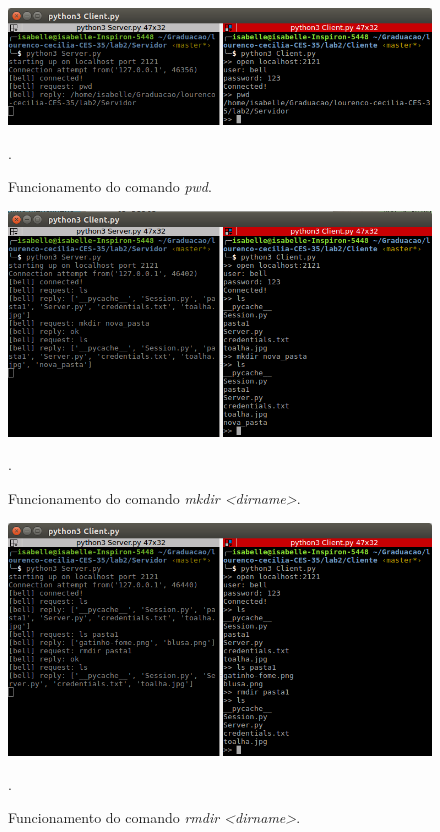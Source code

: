 \documentclass[conference]{IEEEtran}
\begin{document}
\begin{figure}[H]
\centering
\centerline{\includegraphics[scale=0.3]{prints/pwd.png}}
\caption{Funcionamento do comando \textit{pwd}.}.
\label{pwd1}
\end{figure}

\begin{figure}[H]
\centering
\centerline{\includegraphics[scale=0.3]{prints/mkdir1.png}}
\caption{Funcionamento do comando \textit{mkdir <dirname>}.}.
\label{mkdir1}
\end{figure}

\begin{figure}[H]
\centering
\centerline{\includegraphics[scale=0.3]{prints/rmdir1.png}}
\caption{Funcionamento do comando \textit{rmdir <dirname>}.}.
\label{rmdir1}
\end{figure}
\end{document}

